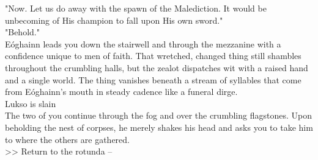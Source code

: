 "Now. Let us do away with the spawn of the Malediction. It would be unbecoming of His champion to fall upon His own sword."\\

"Behold."\\

Eóghainn leads you down the stairwell and through the mezzanine with a confidence unique to men of faith. That wretched, changed thing still shambles throughout the crumbling halls, but the zealot dispatches wit with a raised hand and a single world. The thing vanishes beneath a stream of syllables that come from Eóghainn's mouth in steady cadence like a funeral dirge.\\
 Lukso is slain\\

The two of you continue through the fog and over the crumbling flagstones. Upon beholding the nest of corpses, he merely shakes his head and asks you to take him to where the others are gathered.\\

>> Return to the rotunda -- 